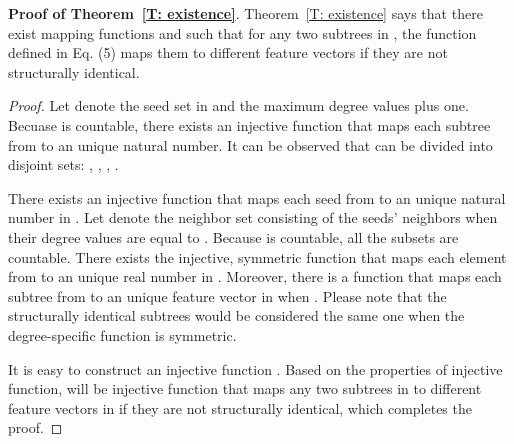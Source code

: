 \documentclass[sigconf]{acmart}
\begin{document}
{\bf Proof of Theorem~\ref{T: existence}}.
Theorem~\ref{T: existence} says that there exist mapping functions  and  such that for any two subtrees in , the function  defined in Eq. (5) maps them to different feature vectors if they are not structurally identical.
\begin{proof}
Let  denote the seed set in  and  the maximum degree values plus one. Becuase  is countable, there exists an injective function  that maps each subtree from  to an unique natural number. It can be observed that  can be divided into  disjoint sets: , , , .

There exists an injective function  that maps each seed from  to an unique natural number in . Let  denote the neighbor set consisting of the seeds' neighbors when their degree values are equal to . Because  is countable, all the subsets  are countable. There exists the injective, symmetric function  that maps each element from  to an unique real number in . Moreover, there is a function  that maps each subtree from  to an unique feature vector in  when . Please note that the structurally identical subtrees would be considered the same one when the degree-specific function  is symmetric.

It is easy to construct an injective function . Based on the properties of injective function,  will be injective function that maps any two subtrees in  to different feature vectors in  if they are not structurally identical, which completes the proof.
\end{proof}
\end{document}
